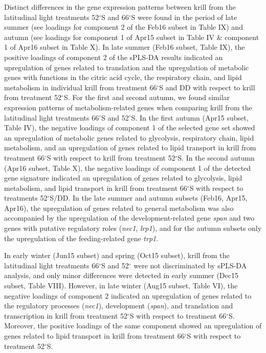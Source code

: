 Distinct differences in the gene expression patterns between krill from the
latitudinal light treatments 52$^{\circ}$S and 66$^{\circ}$S were found in the
period of late summer (see loadings for component 2 of the Feb16 subset in
Table IX) and autumn (see loadings for component 1 of Apr15 subset in Table IV
\& component 1 of Apr16 subset in Table X). In late summer (Feb16 subset, Table
IX), the positive loadings of component 2 of the sPLS-DA results indicated an
upregulation of genes related to translation and the upregulation of metabolic
genes with functions in the citric acid cycle, the respiratory chain, and lipid
metabolism in individual krill from treatment 66$^{\circ}$S and DD with respect
to krill from treatment 52$^{\circ}$S. For the first and second autumn, we found
similar expression patterns of metabolism-related genes when comparing krill
from the latitudinal light treatments 66$^{\circ}$S and 52$^{\circ}$S. In the
first autumn (Apr15 subset, Table IV), the negative loadings of component 1 of
the selected gene set showed an upregulation of metabolic genes related to
glycolysis, respiratory chain, lipid metabolism, and an upregulation of genes
related to lipid transport in krill from treatment 66$^{\circ}$S with respect to
krill from treatment 52$^{\circ}$S. In the second autumn (Apr16 subset, Table
X), the negative loadings of component 1 of the detected gene signature
indicated an upregulation of genes related to glycolysis, lipid metabolism, and
lipid transport in krill from treatment 66$^{\circ}$S with respect to treatments
52$^{\circ}$S/DD. In the late summer and autumn subsets (Feb16, Apr15, Apr16),
the upregulation of genes related to general metabolism was also accompanied by
the upregulation of the development-related gene \textit{span} and two genes
with putative regulatory roles (\textit{nec1}, \textit{lrp1}), and for the
autumn subsets only the upregulation of the feeding-related gene \textit{trp1}.

In early winter (Jun15 subset) and spring (Oct15 subset), krill from the
latitudinal light treatments 66$^{\circ}$S and 52$^{\circ}$ were not
discriminated by sPLS-DA analysis, and only minor differences were detected in
early summer (Dec15 subset, Table VIII). However, in late winter (Aug15 subset,
Table VI), the negative loadings of component 2 indicated an upregulation of
genes related to the regulatory processes (\textit{nec1}), development
(\textit{span}), and translation and transcription in krill from treatment
52$^{\circ}$S with respect to treatment 66$^{\circ}$S. Moreover, the positive
loadings of the same component showed an upregulation of genes related to lipid
transport in krill from treatment 66$^{\circ}$S with respect to treatment
52$^{\circ}$S.

